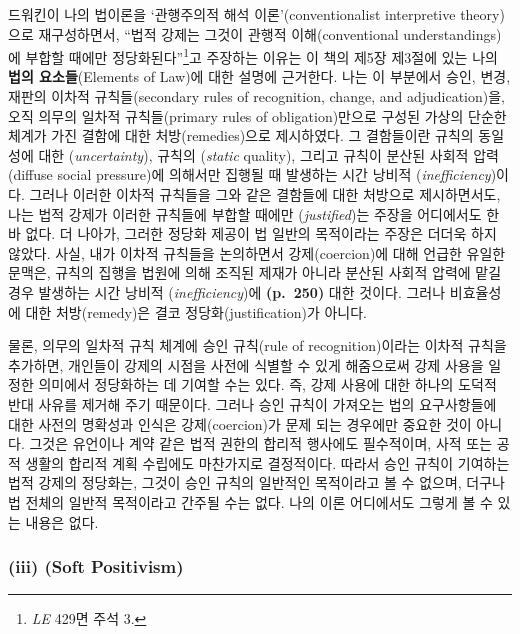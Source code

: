 드워킨이 나의 법이론을 `관행주의적 해석 이론'(conventionalist
interpretive theory)으로 재구성하면서, ``법적 강제는 그것이 관행적
이해(conventional understandings)에 부합할 때에만
정당화된다''\footnote{\emph{LE} 429면 주석 3.}고 주장하는 이유는 이 책의
제5장 제3절에 있는 나의 \textbf{법의 요소들}(Elements of Law)에 대한
설명에 근거한다. 나는 이 부분에서 승인, 변경, 재판의 이차적
규칙들(secondary rules of recognition, change, and adjudication)을, 오직
의무의 일차적 규칙들(primary rules of obligation)만으로 구성된 가상의
단순한 체계가 가진 결함에 대한 처방(remedies)으로 제시하였다. 그
결함들이란 규칙의 동일성에 대한 (\emph{uncertainty}),
규칙의 (\emph{static} quality), 그리고 규칙이 분산된 사회적
압력(diffuse social pressure)에 의해서만 집행될 때 발생하는 시간 낭비적
(\emph{inefficiency})이다. 그러나 이러한 이차적 규칙들을
그와 같은 결함들에 대한 처방으로 제시하면서도, 나는 법적 강제가 이러한
규칙들에 부합할 때에만 (\emph{justified})는 주장을
어디에서도 한 바 없다. 더 나아가, 그러한 정당화 제공이 법 일반의
목적이라는 주장은 더더욱 하지 않았다. 사실, 내가 이차적 규칙들을
논의하면서 강제(coercion)에 대해 언급한 유일한 문맥은, 규칙의 집행을
법원에 의해 조직된 제재가 아니라 분산된 사회적 압력에 맡길 경우 발생하는
시간 낭비적 (\emph{inefficiency})에 \textbf{(p.~250)}
대한 것이다. 그러나 비효율성에 대한 처방(remedy)은 결코
정당화(justification)가 아니다.

물론, 의무의 일차적 규칙 체계에 승인 규칙(rule of recognition)이라는
이차적 규칙을 추가하면, 개인들이 강제의 시점을 사전에 식별할 수 있게
해줌으로써 강제 사용을 일정한 의미에서 정당화하는 데 기여할 수는 있다.
즉, 강제 사용에 대한 하나의 도덕적 반대 사유를 제거해 주기 때문이다.
그러나 승인 규칙이 가져오는 법의 요구사항들에 대한 사전의 명확성과
인식은 강제(coercion)가 문제 되는 경우에만 중요한 것이 아니다. 그것은
유언이나 계약 같은 법적 권한의 합리적 행사에도 필수적이며, 사적 또는
공적 생활의 합리적 계획 수립에도 마찬가지로 결정적이다. 따라서 승인
규칙이 기여하는 법적 강제의 정당화는, 그것이 승인 규칙의 일반적인
목적이라고 볼 수 없으며, 더구나 법 전체의 일반적 목적이라고 간주될 수는
없다. 나의 이론 어디에서도 그렇게 볼 수 있는 내용은 없다.

\subsubsection{\texorpdfstring{(iii) (Soft
Positivism)}{(iii) 연성 실증주의(Soft Positivism)}}\label{iii-uxc5f0uxc131-uxc2e4uxc99duxc8fcuxc758soft-positivism}

